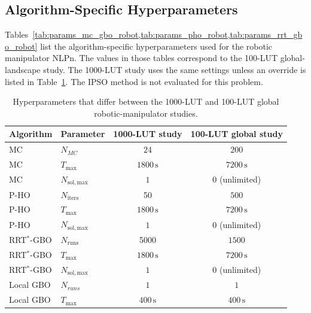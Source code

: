\subsection{Algorithm-Specific Hyperparameters}

Tables~\cref{tab:params_mc_gbo_robot,tab:params_pho_robot,tab:params_rrt_gbo_robot} list 
the algorithm-specific hyperparameters used for the robotic manipulator \ac{NLPn}. 
The values in those tables correspond to the 100-LUT global-landscape study. 
The 1000-LUT study uses the same settings unless an override is listed in Table~\ref{tab:robot-study-hyperparameter-overrides}. 
The \ac{IPSO} method is not evaluated for this problem.

\begin{table}[htbp]
    \centering
    \caption{Hyperparameters that differ between the 1000-LUT and 100-LUT global robotic-manipulator studies.}
    \label{tab:robot-study-hyperparameter-overrides}
    \begin{tabularx}{\textwidth}{l l c c}
        \toprule
        \textbf{Algorithm} & \textbf{Parameter} & \textbf{1000-LUT study} & \textbf{100-LUT global study} \\
        \midrule
        MC & $N_{MC}$ & $24$ & $200$ \\
        MC & $T_{\max}$ & $1800\,\mathrm{s}$ & $7200\,\mathrm{s}$ \\
        MC & $N_{\mathrm{sol,max}}$ & $1$ & $0$ (unlimited) \\
        P-HO & $N_{\mathrm{iters}}$ & 50 & $500$ \\
        P-HO & $T_{\max}$ & $1800\,\mathrm{s}$ & $7200\,\mathrm{s}$ \\
        P-HO & $N_{\mathrm{sol,max}}$ & $1$ & $0$ (unlimited) \\
        RRT$^{*}$-GBO & $N_{\mathrm{runs}}$ & 5000 & $1500$ \\
        RRT$^{*}$-GBO & $T_{\max}$ & $1800\,\mathrm{s}$ & $7200\,\mathrm{s}$ \\
        RRT$^{*}$-GBO & $N_{\mathrm{sol,max}}$ & $1$ & $0$ (unlimited) \\
        Local GBO & $N_{runs}$ & $1$ & $1$ \\
        Local GBO & $T_{\max}$ & $400\,\mathrm{s}$ & $400\,\mathrm{s}$ \\
        \bottomrule
    \end{tabularx}
\end{table}

